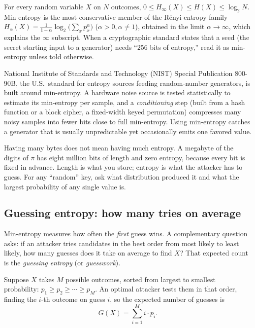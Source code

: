 \begin{formalbox}
For every random variable $X$ on $N$ outcomes, $0 \le H_\infty(X) \le H(X) \le \log_2 N$. Min-entropy is the most conservative member of the R\'enyi entropy family $H_\alpha(X) = \frac{1}{1-\alpha}\log_2\!\bigl(\sum_x p_x^\alpha\bigr)$ ($\alpha > 0, \alpha \ne 1$), obtained in the limit $\alpha \to \infty$, which explains the $\infty$ subscript. When a cryptographic standard states that a seed (the secret starting input to a generator) needs ``$256$ bits of entropy,'' read it as min-entropy unless told otherwise.
\end{formalbox}

\begin{applicationbox}
National Institute of Standards and Technology (NIST) Special Publication 800-90B, the U.S.\ standard for entropy sources feeding random-number generators, is built around min-entropy. A hardware noise source is tested statistically to estimate its min-entropy per sample, and a \emph{conditioning} step (built from a hash function or a block cipher, a fixed-width keyed permutation) compresses many noisy samples into fewer bits close to full min-entropy. Using min-entropy catches a generator that is usually unpredictable yet occasionally emits one favored value.
\end{applicationbox}

\begin{trapbox}
Having many bytes does not mean having much entropy. A megabyte of the digits of $\pi$ has eight million bits of length and zero entropy, because every bit is fixed in advance. Length is what you store; entropy is what the attacker has to guess. For any ``random'' key, ask what distribution produced it and what the largest probability of any single value is.
\end{trapbox}

\subsection{Guessing entropy: how many tries on average}

Min-entropy measures how often the \emph{first} guess wins. A complementary question asks: if an attacker tries candidates in the best order from most likely to least likely, how many guesses does it take on average to find $X$? That expected count is the \emph{guessing entropy} (or \emph{guesswork}).

Suppose $X$ takes $M$ possible outcomes, sorted from largest to smallest probability: $p_1 \ge p_2 \ge \cdots \ge p_M$. An optimal attacker tests them in that order, finding the $i$-th outcome on guess $i$, so the expected number of guesses is
\[
  G(X) = \sum_{i=1}^{M} i \cdot p_i.
\]

